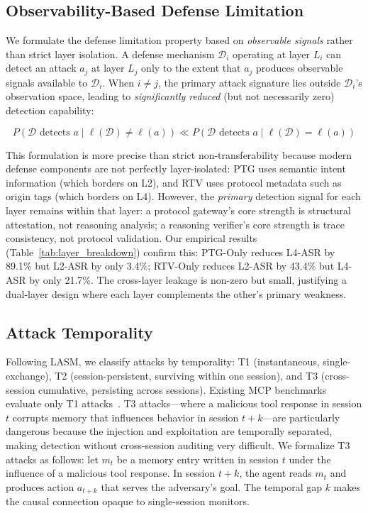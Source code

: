 \subsection{Observability-Based Defense Limitation}

We formulate the defense limitation property based on \emph{observable signals} rather than strict layer isolation. A defense mechanism $\mathcal{D}_i$ operating at layer $L_i$ can detect an attack $a_j$ at layer $L_j$ only to the extent that $a_j$ produces observable signals available to $\mathcal{D}_i$. When $i \neq j$, the primary attack signature lies outside $\mathcal{D}_i$'s observation space, leading to \emph{significantly reduced} (but not necessarily zero) detection capability:

\[
P(\mathcal{D} \text{ detects } a \mid \ell(\mathcal{D}) \neq \ell(a)) \ll P(\mathcal{D} \text{ detects } a \mid \ell(\mathcal{D}) = \ell(a))
\]

This formulation is more precise than strict non-transferability because modern defense components are not perfectly layer-isolated: PTG uses semantic intent information (which borders on L2), and RTV uses protocol metadata such as origin tags (which borders on L4). However, the \emph{primary} detection signal for each layer remains within that layer: a protocol gateway's core strength is structural attestation, not reasoning analysis; a reasoning verifier's core strength is trace consistency, not protocol validation. Our empirical results (Table~\ref{tab:layer_breakdown}) confirm this: PTG-Only reduces L4-ASR by 89.1\% but L2-ASR by only 3.4\%; RTV-Only reduces L2-ASR by 43.4\% but L4-ASR by only 21.7\%. The cross-layer leakage is non-zero but small, justifying a dual-layer design where each layer complements the other's primary weakness.

\subsection{Attack Temporality}

Following LASM, we classify attacks by temporality: T1 (instantaneous, single-exchange), T2 (session-persistent, surviving within one session), and T3 (cross-session cumulative, persisting across sessions). Existing MCP benchmarks evaluate only T1 attacks~\citep{wang2026mcptox}. T3 attacks---where a malicious tool response in session $t$ corrupts memory that influences behavior in session $t+k$---are particularly dangerous because the injection and exploitation are temporally separated, making detection without cross-session auditing very difficult. We formalize T3 attacks as follows: let $m_t$ be a memory entry written in session $t$ under the influence of a malicious tool response. In session $t+k$, the agent reads $m_t$ and produces action $a_{t+k}$ that serves the adversary's goal. The temporal gap $k$ makes the causal connection opaque to single-session monitors.
